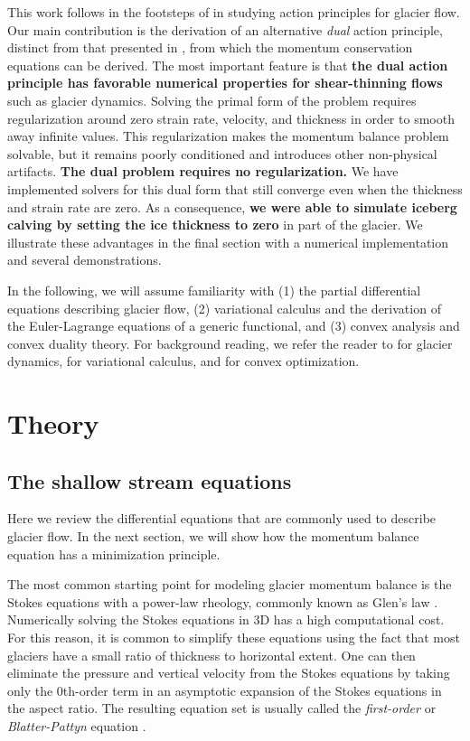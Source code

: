 \documentclass[review,oneside]{igs}
\begin{document}
This work follows in the footsteps of \citet{dukowicz2010consistent} in studying action principles for glacier flow.
Our main contribution is the derivation of an alternative \emph{dual} action principle, distinct from that presented in \citet{dukowicz2010consistent}, from which the momentum conservation equations can be derived.
The most important feature is that \textbf{the dual action principle has favorable numerical properties for shear-thinning flows} such as glacier dynamics.
Solving the primal form of the problem requires regularization around zero strain rate, velocity, and thickness in order to smooth away infinite values.
This regularization makes the momentum balance problem solvable, but it remains poorly conditioned and introduces other non-physical artifacts.
\textbf{The dual problem requires no regularization.}
We have implemented solvers for this dual form that still converge even when the thickness and strain rate are zero.
As a consequence, \textbf{we were able to simulate iceberg calving by setting the ice thickness to zero} in part of the glacier.
We illustrate these advantages in the final section with a numerical implementation and several demonstrations.

In the following, we will assume familiarity with (1) the partial differential equations describing glacier flow, (2) variational calculus and the derivation of the Euler-Lagrange equations of a generic functional, and (3) convex analysis and convex duality theory.
For background reading, we refer the reader to \citet{greve2009dynamics} for glacier dynamics, \citet{weinstock1974calculus} for variational calculus, and \citet{boyd2004convex} for convex optimization.



\section{Theory}

\subsection{The shallow stream equations}

Here we review the differential equations that are commonly used to describe glacier flow.
In the next section, we will show how the momentum balance equation has a minimization principle.

The most common starting point for modeling glacier momentum balance is the Stokes equations with a power-law rheology, commonly known as Glen's law \citep{glen1958law, greve2009dynamics}.
Numerically solving the Stokes equations in 3D has a high computational cost.
For this reason, it is common to simplify these equations using the fact that most glaciers have a small ratio of thickness to horizontal extent.
One can then eliminate the pressure and vertical velocity from the Stokes equations by taking only the 0th-order term in an asymptotic expansion of the Stokes equations in the aspect ratio.
The resulting equation set is usually called the \emph{first-order} or \emph{Blatter-Pattyn} equation \citep{greve2009dynamics}.
\end{document}
